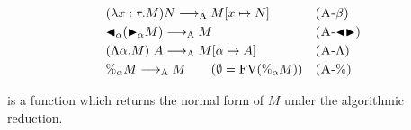 \begin{center}
    \begin{align*}
        & (\lambda x:\tau.M) N \longrightarrow_{\text{A}} M[x \mapsto N]       &  & \textsc{(A-$\beta$)}   \\
        & {\mathop{\blacktriangleleft}}_\alpha ({\mathop{\blacktriangleright}}_\alpha M) \longrightarrow_{\text{A}} M              &  & \textsc{(A-${\mathop{\blacktriangleleft}}{\mathop{\blacktriangleright}}$)} \\
        & (\Lambda \alpha.M)\ A \longrightarrow_{\text{A}} M[\alpha \mapsto A] &  & \textsc{(A-$\Lambda$)} \\
        & \%_\alpha M \longrightarrow_{\text{A}} M \qquad (\emptyset = \text{FV}(\%_\alpha M)) &  & \textsc{(A-$\%$)}
    \end{align*}
\end{center}

\ANF is a function which returns the normal form of \( M \) under the algorithmic reduction.
\begin{center}
 \hfil
\end{center}
